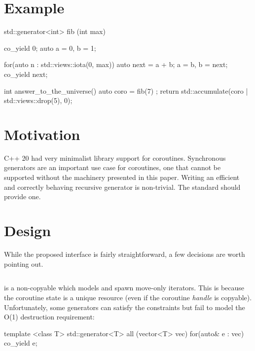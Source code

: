 \documentclass{wg21}
\begin{document}
\section{Example}

\begin{colorblock}
    std::generator<int> fib (int max) {
        co_yield 0;
        auto a = 0, b = 1;

        for(auto n : std::views::iota(0, max))  {
            auto next = a + b;
            a = b, b = next;
            co_yield next;
        }
    }

    int answer_to_the_universe() {
        auto coro = fib(7) ;
        return std::accumulate(coro | std::views::drop(5), 0);
    }

\end{colorblock}

\section{Motivation}

C++ 20 had very minimalist library support for coroutines.
Synchronous generators are an important use case for coroutines, one that cannot be supported without
the machinery presented in this paper.
Writing an efficient and correctly behaving recursive generator is non-trivial. The standard should provide one.


\section{Design}

While the proposed  interface is fairly straightforward, a few decisions are worth pointing out.

\subsection{}

 is a non-copyable  which models  and spawn move-only iterators.
This is because the coroutine state is a unique resource (even if the coroutine \textit{handle} is copyable).
Unfortunately, some generators can satisfy the  constraints but fail to model the  O(1)
destruction requirement:

\begin{colorblock}

    template <class T>
    std::generator<T> all (vector<T> vec) {
        for(auto& e : vec)  {
            co_yield e;
        }
    }

\end{colorblock}
\end{document}
